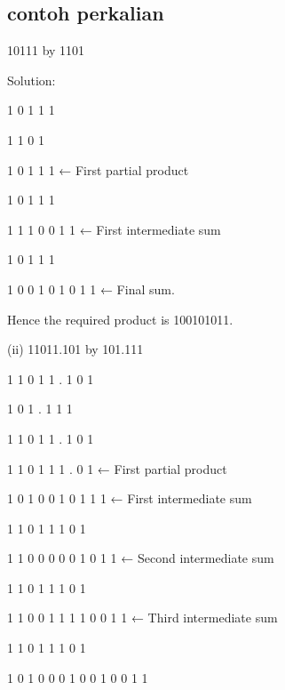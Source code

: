 {\subsection {contoh perkalian}
10111 by 1101

Solution:

                                1 0 1 1 1

                                   1 1 0 1

                                 1 0 1 1 1           ← First partial product

                            1 0 1 1 1     

                            1 1 1 0 0 1 1           ← First intermediate sum

                         1 0 1 1 1          

                       1 0 0 1 0 1 0 1 1           ← Final sum.

Hence the required product is 100101011.


(ii) 11011.101 by 101.111

                                        1 1 0 1 1 . 1 0 1

                                             1 0 1 . 1 1 1  

                                        1 1 0 1 1 . 1 0 1

                                     1 1 0 1 1 1 . 0 1          ← First partial product

                                  1 0 1 0 0 1 0   1 1 1        ← First intermediate sum

                                  1 1 0 1 1 1 0   1        

                               1 1 0 0 0 0 0 1   0 1 1    ← Second intermediate sum

                               1 1 0 1 1 1 0 1              

                             1 1 0 0 1 1 1 1 0   0 1 1        ← Third intermediate sum

                          1 1 0 1 1 1 0 1                    

                       1 0 1 0 0 0 1 0 0 1 0   0 1 1
		     
}
